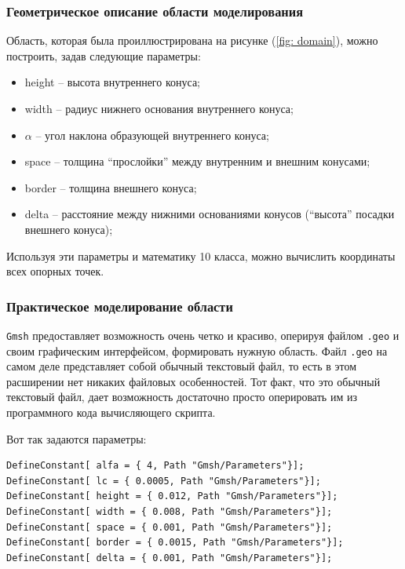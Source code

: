 \documentclass[a4paper, 14pt]{extreport}
\begin{document}
\subsubsection{Геометрическое описание области моделирования}

Область, которая была проиллюстрирована на рисунке (\ref{fig: domain}),
можно построить, задав следующие параметры:
\begin{itemize}
	\item height -- высота внутреннего конуса;
	\item width -- радиус нижнего основания внутреннего конуса;
	\item $\alpha$ -- угол наклона образующей внутреннего конуса;
	\item space -- толщина \enquote{прослойки} между внутренним и внешним 
	конусами;
	\item border -- толщина внешнего конуса;
	\item delta -- расстояние между нижними основаниями конусов 
	(\enquote{высота} посадки внешнего конуса);
\end{itemize}

Используя эти параметры и математику 10 класса,
можно вычислить координаты всех опорных точек.

\subsubsection{Практическое моделирование области}

\texttt{Gmsh} предоставляет возможность очень четко и красиво,
 оперируя файлом \texttt{.geo} и своим графическим интерфейсом,  
формировать нужную область.
Файл \texttt{.geo} на самом деле представляет собой обычный текстовый файл, то есть в этом расширении нет никаких файловых особенностей.
Тот факт, что это обычный текстовый файл, дает возможность достаточно просто оперировать им из программного кода вычисляющего скрипта.

Вот так задаются параметры:
\begin{lstlisting}
DefineConstant[ alfa = { 4, Path "Gmsh/Parameters"}];
DefineConstant[ lc = { 0.0005, Path "Gmsh/Parameters"}];
DefineConstant[ height = { 0.012, Path "Gmsh/Parameters"}];
DefineConstant[ width = { 0.008, Path "Gmsh/Parameters"}];
DefineConstant[ space = { 0.001, Path "Gmsh/Parameters"}];
DefineConstant[ border = { 0.0015, Path "Gmsh/Parameters"}];
DefineConstant[ delta = { 0.001, Path "Gmsh/Parameters"}];
\end{lstlisting}
\end{document}
